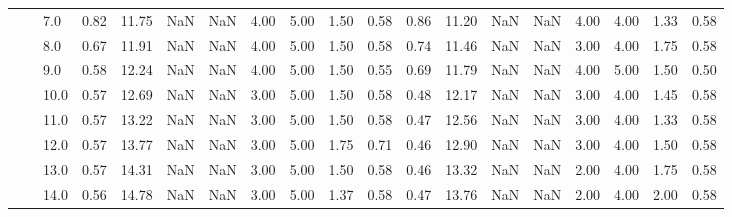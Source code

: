 \begin{tabular}{lllrrrrrrrrrrrrrrrr}
      &     & 7.0  &      0.82 &      11.75 &               NaN &                NaN & 4.00 &   5.00 &             1.50 &                         0.58 &      0.86 &      11.20 &               NaN &                NaN & 4.00 &   4.00 &             1.33 &                         0.58 \\
      &     & 8.0  &      0.67 &      11.91 &               NaN &                NaN & 4.00 &   5.00 &             1.50 &                         0.58 &      0.74 &      11.46 &               NaN &                NaN & 3.00 &   4.00 &             1.75 &                         0.58 \\
      &     & 9.0  &      0.58 &      12.24 &               NaN &                NaN & 4.00 &   5.00 &             1.50 &                         0.55 &      0.69 &      11.79 &               NaN &                NaN & 4.00 &   5.00 &             1.50 &                         0.50 \\
      &     & 10.0 &      0.57 &      12.69 &               NaN &                NaN & 3.00 &   5.00 &             1.50 &                         0.58 &      0.48 &      12.17 &               NaN &                NaN & 3.00 &   4.00 &             1.45 &                         0.58 \\
      &     & 11.0 &      0.57 &      13.22 &               NaN &                NaN & 3.00 &   5.00 &             1.50 &                         0.58 &      0.47 &      12.56 &               NaN &                NaN & 3.00 &   4.00 &             1.33 &                         0.58 \\
      &     & 12.0 &      0.57 &      13.77 &               NaN &                NaN & 3.00 &   5.00 &             1.75 &                         0.71 &      0.46 &      12.90 &               NaN &                NaN & 3.00 &   4.00 &             1.50 &                         0.58 \\
      &     & 13.0 &      0.57 &      14.31 &               NaN &                NaN & 3.00 &   5.00 &             1.50 &                         0.58 &      0.46 &      13.32 &               NaN &                NaN & 2.00 &   4.00 &             1.75 &                         0.58 \\
      &     & 14.0 &      0.56 &      14.78 &               NaN &                NaN & 3.00 &   5.00 &             1.37 &                         0.58 &      0.47 &      13.76 &               NaN &                NaN & 2.00 &   4.00 &             2.00 &                         0.58 \\

\end{tabular}
